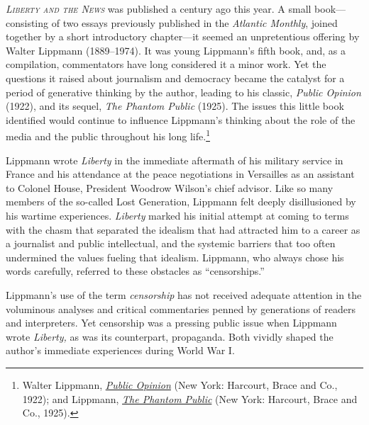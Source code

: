 \documentclass[openany,nobib,twoside,nohyper]{tufte-book}
\begin{document}
\emph{}

\vspace{0.5in}

\noindent \textsc{\emph{Liberty and the News}} was published a century ago this year. A
small book---consisting of two essays previously published in the
\emph{Atlantic Monthly}, joined together by a short introductory
chapter---it seemed an unpretentious offering by Walter Lippmann
(1889--1974). It was young Lippmann's fifth book, and, as a compilation,
commentators have long considered it a minor work. Yet the questions it
raised about journalism and democracy became the catalyst for a period
of generative thinking by the author, leading to his classic,
\emph{Public Opinion} (1922), and its sequel, \emph{The Phantom Public}
(1925). The issues this little book identified would continue to
influence Lippmann's thinking about the role of the media and the public
throughout his long life.\footnote{Walter Lippmann,
  \emph{\href{http://www.worldcat.org/oclc/812629160}{Public Opinion}}
  (New York: Harcourt, Brace and Co., 1922); and Lippmann,
  \emph{\href{http://www.worldcat.org/oclc/550725}{The Phantom Public}}
  (New York: Harcourt, Brace and Co., 1925).}

Lippmann wrote \emph{Liberty} in the immediate aftermath of his military
service in France and his attendance at the peace negotiations in
Versailles as an assistant to Colonel House, President Woodrow Wilson's
chief advisor. Like so many members of the so-called Lost Generation,
Lippmann felt deeply disillusioned by his wartime experiences.
\emph{Liberty} marked his initial attempt at coming to terms with the
chasm that separated the idealism that had attracted him to a career as
a journalist and public intellectual, and the systemic barriers that too
often undermined the values fueling that idealism. Lippmann, who always
chose his words carefully, referred to these obstacles as
``censorships.''

Lippmann's use of the term \emph{censorship} has not received adequate
attention in the voluminous analyses and critical commentaries penned by
generations of readers and interpreters. Yet censorship was a pressing
public issue when Lippmann wrote \emph{Liberty,} as was its counterpart,
propaganda. Both vividly shaped the author's immediate experiences
during World War I.
\end{document}
